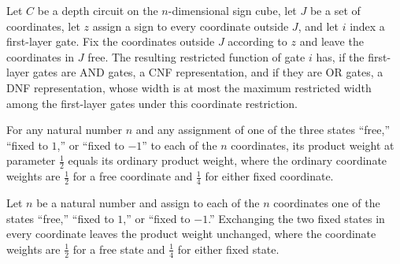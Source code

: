 \begin{theorem}
\label{FABL.DepthCircuit.layer1Function_hasWidthLE_extendedSignRestriction_max}
\leanok
{}
Let $C$ be a depth circuit on the $n$-dimensional sign cube, let $J$ be a set of
coordinates, let $z$ assign a sign to every coordinate outside $J$, and let $i$ index a
first-layer gate. Fix the coordinates outside $J$ according to $z$ and leave the
coordinates in $J$ free. The resulting restricted function of gate $i$ has, if the
first-layer gates are AND gates, a CNF representation, and if they are OR gates, a DNF
representation, whose width is at most the maximum restricted width among the
first-layer gates under this coordinate restriction.
\end{theorem}

\begin{theorem}
\label{FABL.restrictionAssignmentWeightAt_half}
\leanok
{}
For any natural number $n$ and any assignment of one of the three states “free,” “fixed
to $1$,” or “fixed to $-1$” to each of the $n$ coordinates, its product weight at
parameter $\frac12$ equals its ordinary product weight, where the ordinary coordinate
weights are $\frac12$ for a free coordinate and $\frac14$ for either fixed coordinate.
\end{theorem}

\begin{theorem}
\label{FABL.restrictionAssignmentWeight_negateAssignment}
\leanok
{}
Let $n$ be a natural number and assign to each of the $n$ coordinates one of the states
“free,” “fixed to $1$,” or “fixed to $-1$.” Exchanging the two fixed states in every
coordinate leaves the product weight unchanged, where the coordinate weights are
$\frac12$ for a free state and $\frac14$ for either fixed state.
\end{theorem}

